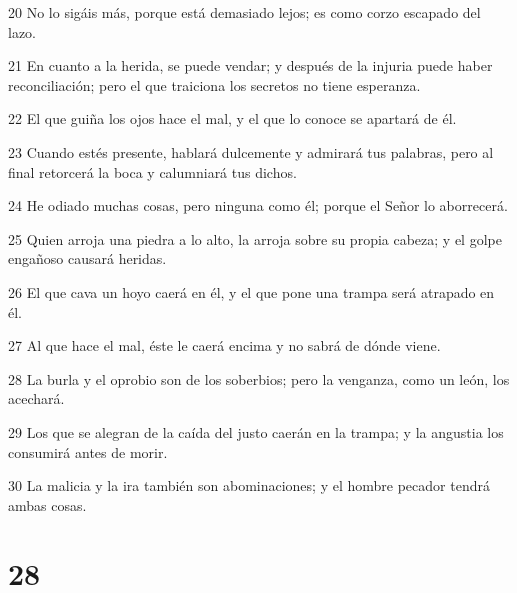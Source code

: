 \par 20 No lo sigáis más, porque está demasiado lejos; es como corzo escapado del lazo.
\par 21 En cuanto a la herida, se puede vendar; y después de la injuria puede haber reconciliación; pero el que traiciona los secretos no tiene esperanza.
\par 22 El que guiña los ojos hace el mal, y el que lo conoce se apartará de él.
\par 23 Cuando estés presente, hablará dulcemente y admirará tus palabras, pero al final retorcerá la boca y calumniará tus dichos.
\par 24 He odiado muchas cosas, pero ninguna como él; porque el Señor lo aborrecerá.
\par 25 Quien arroja una piedra a lo alto, la arroja sobre su propia cabeza; y el golpe engañoso causará heridas.
\par 26 El que cava un hoyo caerá en él, y el que pone una trampa será atrapado en él.
\par 27 Al que hace el mal, éste le caerá encima y no sabrá de dónde viene.
\par 28 La burla y el oprobio son de los soberbios; pero la venganza, como un león, los acechará.
\par 29 Los que se alegran de la caída del justo caerán en la trampa; y la angustia los consumirá antes de morir.
\par 30 La malicia y la ira también son abominaciones; y el hombre pecador tendrá ambas cosas.

\chapter{28}

